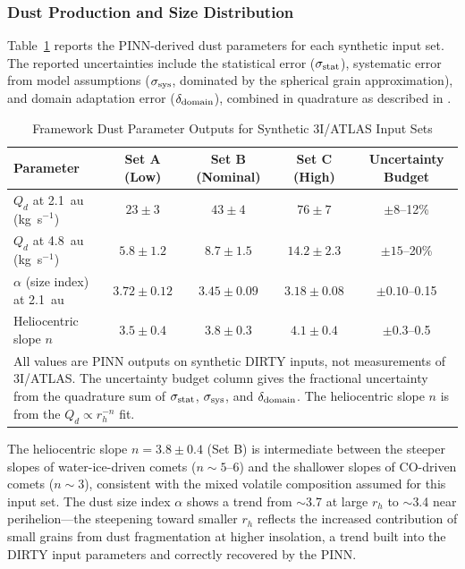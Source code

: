 \documentclass[usenatbib]{mnras}
\begin{document}
\subsubsection{Dust Production and Size Distribution}

Table~\ref{tab:dust_results} reports the PINN-derived dust parameters for each synthetic input set. The reported uncertainties include the statistical error ($\sigma_{\rm stat}$), systematic error from model assumptions ($\sigma_{\rm sys}$, dominated by the spherical grain approximation), and domain adaptation error ($\delta_{\rm domain}$), combined in quadrature as described in \citet{paperI}.

\begin{table}
\centering
\caption{Framework Dust Parameter Outputs for Synthetic 3I/ATLAS Input Sets\label{tab:dust_results}}
\begin{tabular}{lcccc}
\toprule
Parameter & Set A (Low) & Set B (Nominal) & Set C (High) & Uncertainty Budget \\
\midrule
$Q_d$ at 2.1~au (kg~s$^{-1}$) & $23 \pm 3$ & $43 \pm 4$ & $76 \pm 7$ & $\pm 8$--12\% \\
$Q_d$ at 4.8~au (kg~s$^{-1}$) & $5.8 \pm 1.2$ & $8.7 \pm 1.5$ & $14.2 \pm 2.3$ & $\pm 15$--20\% \\
$\alpha$ (size index) at 2.1~au & $3.72 \pm 0.12$ & $3.45 \pm 0.09$ & $3.18 \pm 0.08$ & $\pm 0.10$--0.15 \\
Heliocentric slope $n$ & $3.5 \pm 0.4$ & $3.8 \pm 0.3$ & $4.1 \pm 0.4$ & $\pm 0.3$--0.5 \\
\bottomrule
\multicolumn{5}{l}{\small All values are PINN outputs on synthetic DIRTY inputs, not measurements of 3I/ATLAS. The uncertainty budget column gives the fractional uncertainty from the quadrature sum of $\sigma_{\rm stat}$, $\sigma_{\rm sys}$, and $\delta_{\rm domain}$. The heliocentric slope $n$ is from the $Q_d \propto r_h^{-n}$ fit.}
\end{tabular}
\end{table}

The heliocentric slope $n = 3.8 \pm 0.4$ (Set B) is intermediate between the steeper slopes of water-ice-driven comets ($n \sim 5$--6) and the shallower slopes of CO-driven comets ($n \sim 3$), consistent with the mixed volatile composition assumed for this input set. The dust size index $\alpha$ shows a trend from $\sim$3.7 at large $r_h$ to $\sim$3.4 near perihelion---the steepening toward smaller $r_h$ reflects the increased contribution of small grains from dust fragmentation at higher insolation, a trend built into the DIRTY input parameters and correctly recovered by the PINN.
\end{document}
